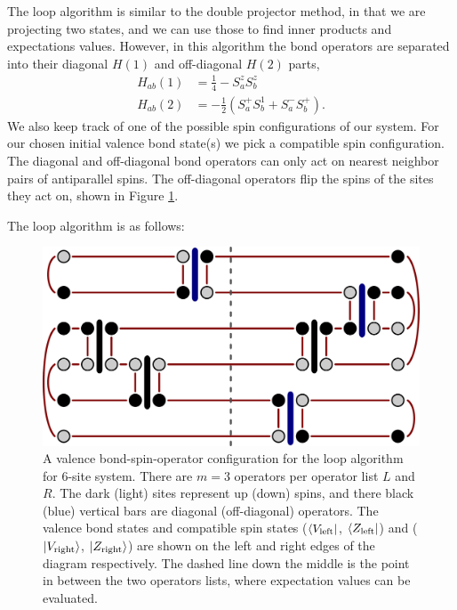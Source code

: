 The loop algorithm is similar to the double projector method, in that we are projecting two states, and we can use those to find inner products and expectations values.
However, in this algorithm the bond operators are separated into their diagonal $H(1)$ and off-diagonal $H(2)$ parts,
\begin{align}
H_{ab}(1)&= \tfrac{1}{4} - S_a^zS^z_b \\
H_{ab}(2)&= -\tfrac{1}{2}( S_a^+S^1_b + S_a^-S^+_b).
\end{align}
We also keep track of one of the possible spin configurations of our system.  
For our chosen initial valence bond state(s) we pick a compatible spin configuration.
The diagonal and off-diagonal bond operators can only act on nearest neighbor pairs of antiparallel spins.
The off-diagonal operators flip the spins of the sites they act on, shown in Figure \ref{fig:loopalg}.


The loop algorithm is as follows:

\begin{figure}
\centering
\includegraphics[width=6in]{./figures/made/loopalg.pdf}
\caption[A valence bond-spin-operator configuration for the loop algorithm]{
	A valence bond-spin-operator configuration for the loop algorithm for 6-site system.
	There are $m=3$ operators per operator list $L$ and $R$.
	The dark (light) sites represent up (down) spins, and there black (blue) vertical bars are diagonal (off-diagonal) operators.
	The valence bond states and compatible spin states ($\langle {V_\text{left}} \rvert$, $\langle {Z_\text{left}} \rvert$) and ($\lvert {V_\text{right}} \rangle$, $\lvert {Z_\text{right}} \rangle$) are shown on the left and right edges of the diagram respectively.
	The dashed line down the middle is the point in between the two operators lists, where expectation values can be evaluated.
	\label{fig:loopalg}
}
\end{figure}


